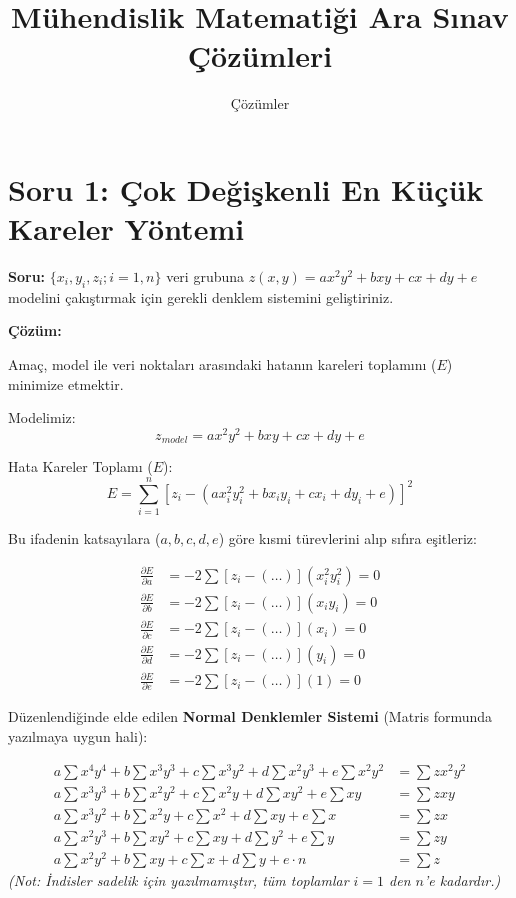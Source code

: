 \documentclass[12pt, a4paper]{article}
\title{\textbf{Mühendislik Matematiği Ara Sınav Çözümleri}}
\author{Çözümler}
\date{}
\begin{document}
\maketitle

\section*{Soru 1: Çok Değişkenli En Küçük Kareler Yöntemi}

\textbf{Soru:} $\{x_i, y_i, z_i; i=1, n\}$ veri grubuna $z(x,y) = ax^2y^2 + bxy + cx + dy + e$ modelini çakıştırmak için gerekli denklem sistemini geliştiriniz.

\textbf{Çözüm:}

Amaç, model ile veri noktaları arasındaki hatanın kareleri toplamını ($E$) minimize etmektir.

Modelimiz: 
\[ z_{model} = ax^2y^2 + bxy + cx + dy + e \]

Hata Kareler Toplamı ($E$):
\begin{equation}
E = \sum_{i=1}^{n} \left[ z_i - (ax_i^2y_i^2 + bx_iy_i + cx_i + dy_i + e) \right]^2
\end{equation}

Bu ifadenin katsayılara ($a, b, c, d, e$) göre kısmi türevlerini alıp sıfıra eşitleriz:

\begin{align*}
\frac{\partial E}{\partial a} &= -2 \sum [z_i - (\dots)] (x_i^2y_i^2) = 0 \\
\frac{\partial E}{\partial b} &= -2 \sum [z_i - (\dots)] (x_iy_i) = 0 \\
\frac{\partial E}{\partial c} &= -2 \sum [z_i - (\dots)] (x_i) = 0 \\
\frac{\partial E}{\partial d} &= -2 \sum [z_i - (\dots)] (y_i) = 0 \\
\frac{\partial E}{\partial e} &= -2 \sum [z_i - (\dots)] (1) = 0
\end{align*}

Düzenlendiğinde elde edilen \textbf{Normal Denklemler Sistemi} (Matris formunda yazılmaya uygun hali):

\begin{equation}
\begin{aligned}
a\sum x^4y^4 + b\sum x^3y^3 + c\sum x^3y^2 + d\sum x^2y^3 + e\sum x^2y^2 &= \sum z x^2y^2 \\
a\sum x^3y^3 + b\sum x^2y^2 + c\sum x^2y + d\sum xy^2 + e\sum xy &= \sum z xy \\
a\sum x^3y^2 + b\sum x^2y + c\sum x^2 + d\sum xy + e\sum x &= \sum z x \\
a\sum x^2y^3 + b\sum xy^2 + c\sum xy + d\sum y^2 + e\sum y &= \sum z y \\
a\sum x^2y^2 + b\sum xy + c\sum x + d\sum y + e\cdot n &= \sum z
\end{aligned}
\end{equation}
\textit{(Not: İndisler sadelik için yazılmamıştır, tüm toplamlar $i=1$ den $n$'e kadardır.)}
\end{document}
